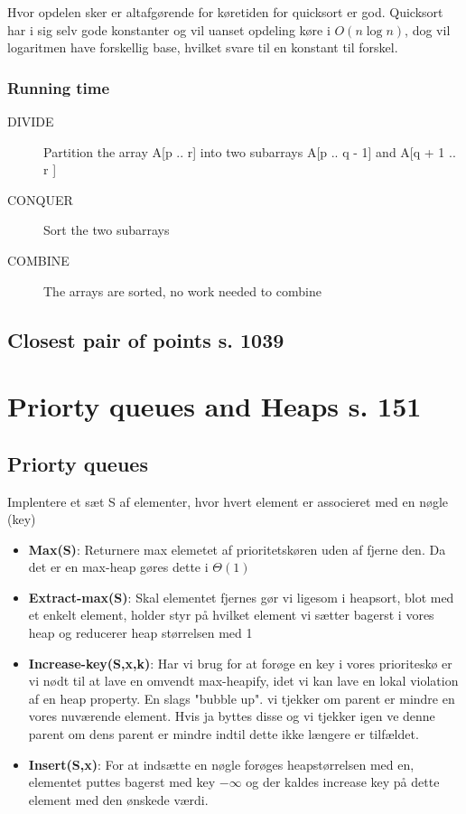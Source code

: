\documentclass[11pt,a4paper]{report}
\theoremstyle{plain}
\theoremstyle{definition}
\theoremstyle{remark}
\numberwithin{equation}{section}
\begin{document}
Hvor opdelen sker er altafgørende for køretiden for quicksort er god. Quicksort har i sig selv gode konstanter og vil uanset opdeling køre i $O(n \log n)$, dog vil logaritmen have forskellig base, hvilket svare til en konstant til forskel.

\subsection{Running time}

\begin{description}
  \item[DIVIDE] Partition the array A[p .. r] into two subarrays A[p .. q - 1] and A[q + 1 .. r ]
  \item[CONQUER] Sort the two subarrays
  \item[COMBINE] The arrays are sorted, no work needed to combine
\end{description}

\section{Closest pair of points s. 1039}

\chapter{Priorty queues and Heaps s. 151}
\section{Priorty queues}
Implentere et sæt S af elementer, hvor hvert element er associeret med en nøgle (key)
\begin{itemize}
  \item \textbf{Max(S)}: Returnere max elemetet af prioritetskøren uden af fjerne den. Da det er en max-heap gøres dette i $\Theta(1)$
  \item \textbf{Extract-max(S)}:  Skal elementet fjernes gør vi ligesom i heapsort, blot med et enkelt element, holder styr på hvilket element vi sætter bagerst i vores heap og reducerer heap størrelsen med 1
  \item \textbf{Increase-key(S,x,k)}: Har vi brug for at forøge en key i vores prioriteskø er vi nødt til at lave en omvendt max-heapify, idet vi kan lave en lokal violation af en heap property. En slags "bubble up". vi tjekker om parent er mindre en vores nuværende element. Hvis ja byttes disse og vi tjekker igen ve denne parent om dens parent er mindre indtil dette ikke længere er tilfældet.
  \item \textbf{Insert(S,x)}: For at indsætte en nøgle forøges heapstørrelsen med en, elementet puttes bagerst med key $-\infty$ og der kaldes increase key på dette element med den ønskede værdi.
\end{itemize}
\end{document}
